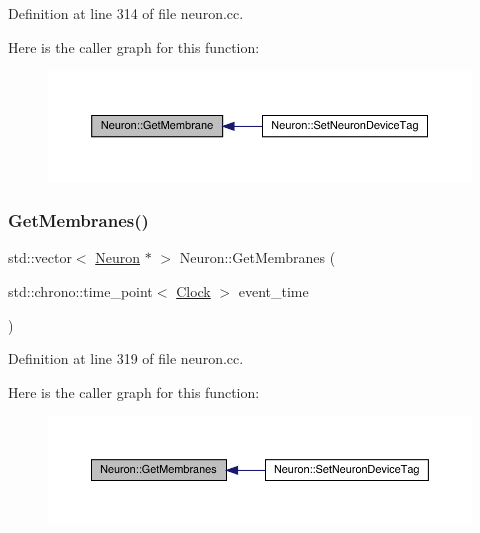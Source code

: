 Definition at line 314 of file neuron.\+cc.

Here is the caller graph for this function\+:
\nopagebreak
\begin{figure}[H]
\begin{center}
\leavevmode
\includegraphics[width=350pt]{class_neuron_a5bc4e67c5f2d8a3bcd160aa3f5086aec_icgraph}
\end{center}
\end{figure}
\mbox{\label{class_neuron_ac759d9589c0505332e8238cafbc8fa66}} 
\subsubsection{\texorpdfstring{Get\+Membranes()}{GetMembranes()}}
{\footnotesize\ttfamily std\+::vector$<$ \hyperlink{class_neuron}{Neuron} $\ast$ $>$ Neuron\+::\+Get\+Membranes (\begin{DoxyParamCaption}\item[{std\+::chrono\+::time\+\_\+point$<$ \hyperlink{universe_8h_a0ef8d951d1ca5ab3cfaf7ab4c7a6fd80}{Clock} $>$}]{event\+\_\+time }\end{DoxyParamCaption})}



Definition at line 319 of file neuron.\+cc.

Here is the caller graph for this function\+:
\nopagebreak
\begin{figure}[H]
\begin{center}
\leavevmode
\includegraphics[width=350pt]{class_neuron_ac759d9589c0505332e8238cafbc8fa66_icgraph}
\end{center}
\end{figure}
\mbox{\label{class_neuron_aff3a33f5d8ef5dacdec9c03df50f168c}} 
